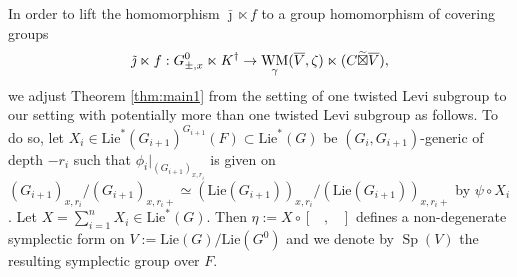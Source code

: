 \documentclass{article}
\def\ol#1{\overline{#1}}
\DeclareMathOperator{\Sp}{Sp}
\theoremstyle{definition}
\numberwithin{equation}{subsection}
\renewcommand{\-}{\hyp{}}
\DeclareMathOperator{\WM}{WM}
\begin{document}
In order to lift the homomorphism $\bar \jmath \ltimes f$ to a group homomorphism of covering groups
\[\tilde\jmath \ltimes f: G^0_{\pm, x} \ltimes K^\dagger \ra \WM_\gamma(\ol{V}, \zeta) \ltimes(C \widetilde{\boxtimes} \ol{V}),\]
we adjust Theorem \ref{thm:main1} from the setting of one twisted Levi subgroup to our setting with potentially more than one twisted Levi subgroup as follows. To do so, let $X_i \in \mathrm{Lie}^*(G_{i+1})^{G_{i+1}}(F)\subset \mathrm{Lie}^*(G)$ be $(G_i, G_{i+1})$-generic of depth $-r_i$ such that $\phi_i|_{(G_{i+1})_{x,r_i}}$ is given on $(G_{i+1})_{x,r_i}/(G_{i+1})_{x,r_i+} \simeq (\mathrm{Lie}(G_{i+1}))_{x,r_i}/(\mathrm{Lie}(G_{i+1}))_{x,r_i+}$ by $\psi \circ X_i$. 
Let $X=\sum_{i=1}^n X_i \in \mathrm{Lie}^*(G)$. Then $\eta:=X \circ [\phantom{X},\phantom{X}]$ defines a non-degenerate symplectic form on $V:=\mathrm{Lie}(G)/\mathrm{Lie}(G^0)$ and we denote by $\Sp(V)$ the resulting symplectic group over $F$.
\end{document}
